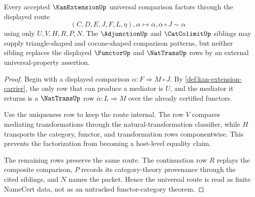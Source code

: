 \begin{theorem}
\label{thm:kan-extension-universal-route}
Every accepted $\KanExtensionUp$ universal comparison factors through the displayed route
$$
(C,D,E,J,F,L,\eta),\alpha \longmapsto \overline{\alpha},\overline{\alpha}\circ J \sim \alpha
$$
using only $U,V,H,R,P,N$. The $\AdjunctionUp$ and $\CatColimitUp$ siblings may supply triangle-shaped and cocone-shaped comparison patterns, but neither sibling replaces the displayed $\FunctorUp$ and $\NatTransUp$ rows by an external universal-property assertion.
\end{theorem}
\begin{proof}
Begin with a displayed comparison $\alpha:F\Rightarrow M\circ J$. By \autoref{def:kan-extension-carrier}, the only row that can produce a mediator is $U$, and the mediator it returns is a $\NatTransUp$ row $\overline{\alpha}:L\Rightarrow M$ over the already certified functors.

Use the uniqueness row to keep the route internal. The row $V$ compares mediating transformations through the natural-transformation classifier, while $H$ transports the category, functor, and transformation rows componentwise. This prevents the factorization from becoming a host-level equality claim.

The remaining rows preserve the same route. The continuation row $R$ replays the composite comparison, $P$ records its category-theory provenance through the cited siblings, and $N$ names the packet. Hence the universal route is read as finite NameCert data, not as an untracked functor-category theorem.
\end{proof}


\begin{closurestatus}{\KanExtensionUp}
  \theoryclosure{\obligationClosure}
  \formalstatus{\unformalizedV}
\end{closurestatus}
